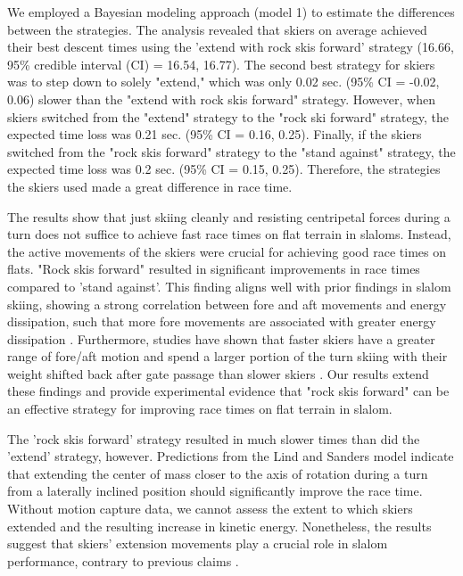 \documentclass{report}
\begin{document}
We employed a Bayesian modeling approach (model 1) to estimate the differences between the strategies. The analysis revealed that skiers on average achieved their best descent times using the 'extend with rock skis forward' strategy (16.66, 95\% credible interval (CI) = 16.54, 16.77). The second best strategy for skiers was to step down to solely "extend," which was only 0.02 sec. (95\% CI = -0.02, 0.06) slower than the "extend with rock skis forward" strategy. However, when skiers switched from the "extend" strategy to the "rock ski forward" strategy, the expected time loss was 0.21 sec. (95\% CI = 0.16, 0.25). Finally, if the skiers switched from the "rock skis forward" strategy to the "stand against" strategy, the expected time loss was 0.2 sec. (95\% CI = 0.15, 0.25). Therefore, the strategies the skiers used made a great difference in race time.

The results show that just skiing cleanly and resisting centripetal forces during a turn does not suffice to achieve fast race times on flat terrain in slaloms. Instead, the active movements of the skiers were crucial for achieving good race times on flats. "Rock skis forward" resulted in significant improvements in race times compared to 'stand against'. This finding aligns well with prior findings in slalom skiing, showing a strong correlation between fore and aft movements and energy dissipation, such that more fore movements are associated with greater energy dissipation \cite{reid_turn_2009, reid_kinematic_2010}. Furthermore, studies have shown that faster skiers have a greater range of fore/aft motion and spend a larger portion of the turn skiing with their weight shifted back after gate passage than slower skiers \cite{tjorhom_beskrivelse_2007, reid_kinematic_2010}. Our results extend these findings and provide experimental evidence that "rock skis forward" can be an effective strategy for improving race times on flat terrain in slalom.

The 'rock skis forward' strategy resulted in much slower times than did the 'extend' strategy, however. Predictions from the Lind and Sanders model \cite{lind_physics_2013} indicate that extending the center of mass closer to the axis of rotation during a turn from a laterally inclined position should significantly improve the race time. Without motion capture data, we cannot assess the extent to which skiers extended and the resulting increase in kinetic energy. Nonetheless, the results suggest that skiers' extension movements play a crucial role in slalom performance, contrary to previous claims \cite{supej_differential_2008}.
\end{document}
